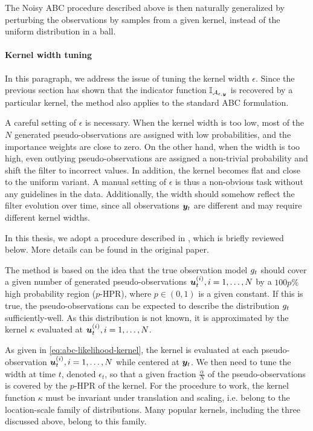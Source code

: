 The Noisy ABC procedure described above is then naturally generalized by perturbing the observations by samples from a given kernel, instead of the uniform distribution in a ball.


\paragraph{Kernel width tuning}
In this paragraph, we address the issue of tuning the kernel width $\epsilon$. Since the previous section has shown that the indicator function $\mathbb{I}_{\mathcal{A}_{\epsilon, \bm{y}}}$ is recovered by a particular kernel, the method also applies to the standard ABC formulation.

A careful setting of $\epsilon$ is necessary. When the kernel width is too low, most of the $N$ generated pseudo-observations are assigned with low probabilities, and the importance weights are close to zero. On the other hand, when the width is too high, even outlying pseudo-observations are assigned a non-trivial probability and shift the filter to incorrect values. In addition, the kernel becomes flat and close to the uniform variant. A manual setting of $\epsilon$ is thus a non-obvious task without any guidelines in the data. Additionally, the width should somehow reflect the filter evolution over time, since all observations $\bm{y}_t$ are different and may require different kernel widths.

In this thesis, we adopt a procedure described in \cite{dedecius}, which is briefly reviewed below. More details can be found in the original paper.

The method is based on the idea that the true observation model $g_t$ should cover a given number of generated pseudo-observations $\bm{u}_t^{(i)}, i = 1, \ldots, N$ by a $100p\%$ high probability region ($p$-HPR), where $p \in \left(0, 1\right)$ is a given constant. If this is true, the pseudo-observations can be expected to describe the distribution $g_t$ sufficiently-well. As this distribution is not known, it is approximated by the kernel $\kappa$ evaluated at $\bm{u}_t^{(i)}, i = 1, \ldots, N$.

As given in \eqref{eq:abc-likelihood-kernel}, the kernel is evaluated at each pseudo-observation $\bm{u}_t^{(i)}, i = 1, \ldots, N$ while centered at $\bm{y}_t$. We then need to tune the width at time $t$, denoted $\epsilon_t$, so that a given fraction $\frac{\alpha}{N}$ of the pseudo-observations is covered by the $p$-HPR of the kernel. For the procedure to work, the kernel function $\kappa$ must be invariant under translation and scaling, i.e. belong to the location-scale family of distributions. Many popular kernels, including the three discussed above, belong to this family.


